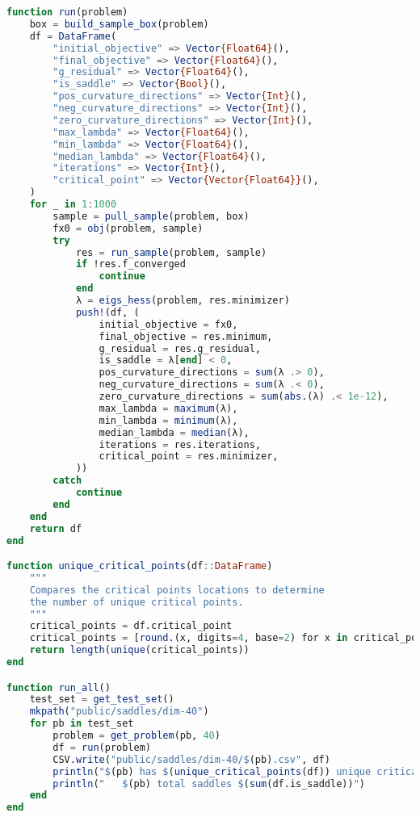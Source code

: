 \documentclass[10pt]{article}
\begin{document}
\begin{lstlisting}[language=julia, caption={Algorithm 16.5}, label={lst:problem-sampling}]
function run(problem)
    box = build_sample_box(problem)
    df = DataFrame(
        "initial_objective" => Vector{Float64}(),
        "final_objective" => Vector{Float64}(), 
        "g_residual" => Vector{Float64}(),
        "is_saddle" => Vector{Bool}(),
        "pos_curvature_directions" => Vector{Int}(),
        "neg_curvature_directions" => Vector{Int}(),
        "zero_curvature_directions" => Vector{Int}(),
        "max_lambda" => Vector{Float64}(),
        "min_lambda" => Vector{Float64}(),
        "median_lambda" => Vector{Float64}(),
        "iterations" => Vector{Int}(),
        "critical_point" => Vector{Vector{Float64}}(),  
    )
    for _ in 1:1000
        sample = pull_sample(problem, box)
        fx0 = obj(problem, sample)
        try
            res = run_sample(problem, sample)
            if !res.f_converged
                continue
            end
            λ = eigs_hess(problem, res.minimizer)
            push!(df, (
                initial_objective = fx0,
                final_objective = res.minimum,
                g_residual = res.g_residual,
                is_saddle = λ[end] < 0,
                pos_curvature_directions = sum(λ .> 0),
                neg_curvature_directions = sum(λ .< 0),
                zero_curvature_directions = sum(abs.(λ) .< 1e-12),
                max_lambda = maximum(λ),
                min_lambda = minimum(λ),
                median_lambda = median(λ),
                iterations = res.iterations,
                critical_point = res.minimizer,
            ))
        catch
            continue
        end
    end
    return df
end

function unique_critical_points(df::DataFrame)
    """
    Compares the critical points locations to determine
    the number of unique critical points.
    """
    critical_points = df.critical_point
    critical_points = [round.(x, digits=4, base=2) for x in critical_points] # HACK d
    return length(unique(critical_points))
end

function run_all()
    test_set = get_test_set()
    mkpath("public/saddles/dim-40")
    for pb in test_set
        problem = get_problem(pb, 40)
        df = run(problem)
        CSV.write("public/saddles/dim-40/$(pb).csv", df)
        println("$(pb) has $(unique_critical_points(df)) unique critical points.")
        println("   $(pb) total saddles $(sum(df.is_saddle))")
    end
end
\end{lstlisting}
\end{document}

